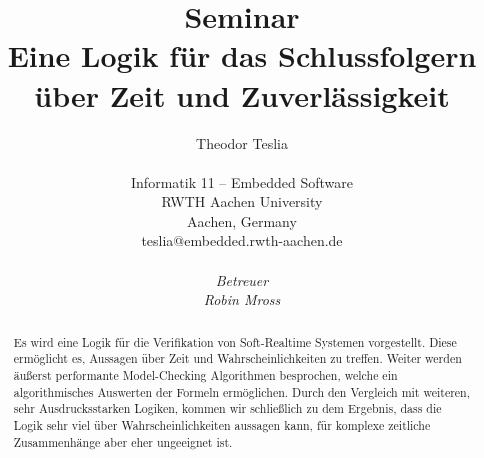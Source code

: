 \documentclass{lni}
\author{
	Theodor Teslia \\ 
	\\ 
	Informatik 11 -- Embedded Software \\ 
	RWTH Aachen University \\ 
	Aachen, Germany \\ 
	teslia@embedded.rwth-aachen.de\\
	\\
	\textit{Betreuer}\\
	\textit{Robin Mross}\\ %
}
\title{\small{Seminar} \\ \vspace{0.5cm} \Large{Eine Logik für das Schlussfolgern über Zeit und Zuverlässigkeit}}
\theoremstyle{def_style}
\theoremstyle{break}
\begin{document}
\maketitle

\begin{abstract}
	Es wird eine Logik für die Verifikation von Soft-Realtime Systemen vorgestellt.
	Diese ermöglicht es, Aussagen über Zeit und Wahrscheinlichkeiten zu treffen.
	Weiter werden äußerst performante Model-Checking Algorithmen besprochen, welche ein algorithmisches Auswerten der Formeln ermöglichen.
	Durch den Vergleich mit weiteren, sehr Ausdrucksstarken Logiken, kommen wir schließlich zu dem Ergebnis, dass die Logik sehr viel über Wahrscheinlichkeiten aussagen kann, für komplexe zeitliche Zusammenhänge aber eher ungeeignet ist.
\end{abstract}














\end{document}
